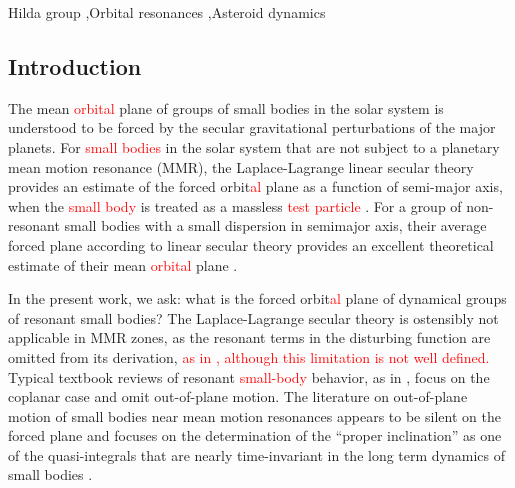 \documentclass[a4paper,fleqn]{cas-sc}
\begin{document}
\begin{keywords}
 Hilda group \sep Orbital resonances \sep Asteroid dynamics
\end{keywords}

\maketitle

\begin{linenumbers}


\section{Introduction}
\label{s:introduction}
The mean \textcolor{red}{orbital} plane of groups of small bodies in the solar system is understood to be forced by the secular gravitational perturbations of the major planets.
For \textcolor{red}{small bodies} in the solar system that are not subject to a planetary mean motion resonance (MMR), the Laplace-Lagrange linear secular theory provides an estimate of the forced orbit\textcolor{red}{al} plane as a function of semi-major axis, when the \textcolor{red}{small body} is treated as a massless \textcolor{red}{test particle} \citep{md99}.
For a group of non-resonant small bodies with a small dispersion in semimajor axis, their average forced plane according to linear secular theory provides an excellent theoretical estimate of their mean \textcolor{red}{orbital} plane \citep{cc08,vm17,mm23}.

In the present work, we ask: what is the forced orbit\textcolor{red}{al} plane of dynamical groups of resonant small bodies? 
The Laplace-Lagrange secular theory is ostensibly not applicable in MMR zones, as the resonant terms in the disturbing function are omitted from its derivation, \textcolor{red}{as in \citet[chapters 6-7]{md99}, although this limitation is not well defined.}
Typical textbook reviews of resonant \textcolor{red}{small-body} behavior, as in \citet[chapter 8]{md99}, focus on the coplanar case and omit out-of-plane motion.
The literature on out-of-plane motion of small bodies near mean motion resonances appears to be silent on the forced plane and focuses on the determination of the ``proper inclination'' as one of the quasi-integrals that are nearly time-invariant in the long term dynamics of small bodies \citep[e.g.][]{Knezevic:2002,Nesvorny:2024}.


\end{linenumbers}
\end{document}
